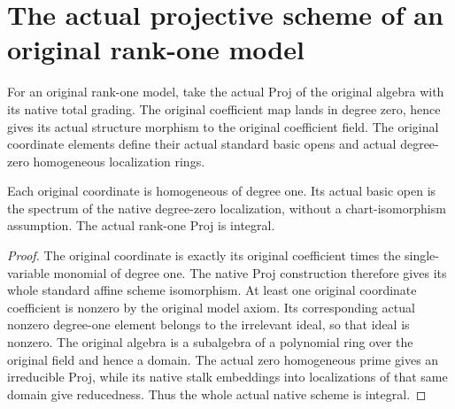 \section{The actual projective scheme of an original rank-one model}

\begin{definition}
\label{def:fc-native-rank-one-model}
\leanok
{}
For an original rank-one model, take the actual Proj of the original
algebra with its native total grading. The original coefficient map lands
in degree zero, hence gives its actual structure morphism to the original
coefficient field. The original coordinate elements define their actual
standard basic opens and actual degree-zero homogeneous localization rings.
\end{definition}

\begin{lemma}
\label{lem:fc-native-rank-one-model-charts}
\leanok
{}
Each original coordinate is homogeneous of degree one. Its actual basic
open is the spectrum of the native degree-zero localization, without a
chart-isomorphism assumption. The actual rank-one Proj is integral.
\end{lemma}
\begin{proof}
The original coordinate is exactly its original coefficient times the
single-variable monomial of degree one. The native Proj construction
therefore gives its whole standard affine scheme isomorphism. At least
one original coordinate coefficient is nonzero by the original model
axiom. Its corresponding actual nonzero degree-one element belongs to
the irrelevant ideal, so that ideal is nonzero. The original algebra is
a subalgebra of a polynomial ring over the original field and hence a
domain. The actual zero homogeneous prime gives an irreducible Proj,
while its native stalk embeddings into localizations of that same domain
give reducedness. Thus the whole actual native scheme is integral.
\end{proof}
